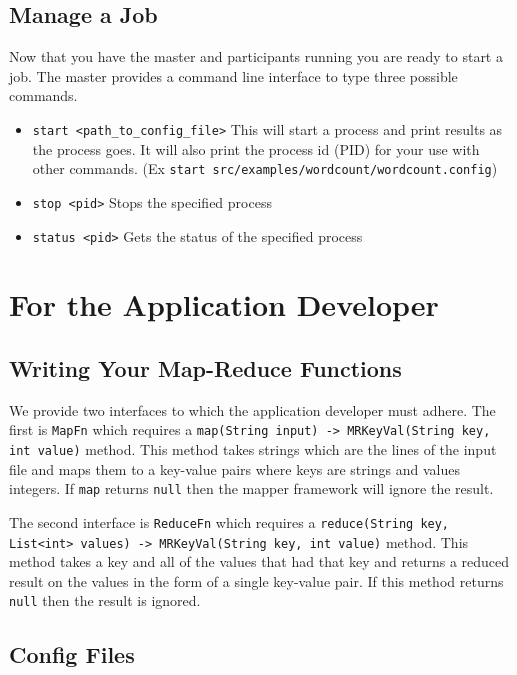 \documentclass[12pt]{article}
\newcommand{\ttt}{\texttt}
\begin{document}
\subsection{Manage a Job}

Now that you have the master and participants running you are ready to start a job. The master provides a command line interface to type three possible commands.

\begin{itemize}
\item
\ttt{start <path\_to\_config\_file>} This will start a process and print results as the process goes. It will also print the process id (PID) for your use with other commands. (Ex  \ttt{start src/examples/wordcount/wordcount.config})

\item
\ttt{stop <pid>} Stops the specified process

\item
\ttt{status <pid>} Gets the status of the specified process

\end{itemize}

\section{For the Application Developer}

\subsection{Writing Your Map-Reduce Functions}

We provide two interfaces to which the application developer must adhere. The first is \ttt{MapFn} which requires a \ttt{map(String input) -> MRKeyVal(String key, int value)} method. This method takes strings which are the lines of the input file and maps them to a key-value pairs where keys are strings and values integers. If \ttt{map} returns \ttt{null} then the mapper framework will ignore the result.

The second interface is \ttt{ReduceFn} which requires a \ttt{reduce(String key, List<int> values) -> MRKeyVal(String key, int value)} method. This method takes a key and all of the values that had that key and returns a reduced result on the values in the form of a single key-value pair. If this method returns \ttt{null} then the result is ignored.

\subsection{Config Files}
\end{document}
